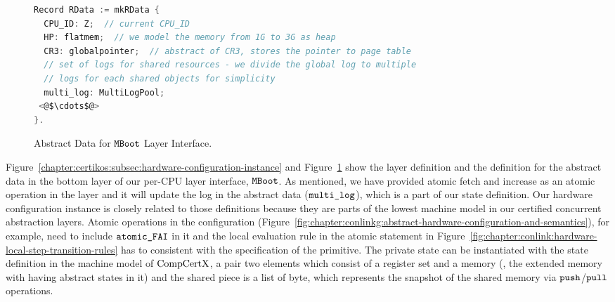 \begin{figure}
\begin{lstlisting}[language=C]
Record RData := mkRData {
  CPU_ID: Z;  // current CPU_ID
  HP: flatmem;  // we model the memory from 1G to 3G as heap            
  CR3: globalpointer;  // abstract of CR3, stores the pointer to page table
  // set of logs for shared resources - we divide the global log to multiple
  // logs for each shared objects for simplicity   
  multi_log: MultiLogPool;     
 <@$\cdots$@>
}.
\end{lstlisting}
\caption{Abstract Data for  ${\mathrm{\texttt{MBoot}}}$ Layer Interface.}
\label{fig:chapter:certikos:abstract-data-for-bottom-layer}
\end{figure}

Figure~\ref{chapter:certikos:subsec:hardware-configuration-instance}
 and 
  Figure~\ref{fig:chapter:certikos:abstract-data-for-bottom-layer}
  show the layer definition 
  and the definition for the abstract data 
  in the bottom layer of our per-CPU layer interface, ${\mathrm{\texttt{MBoot}}}$.
%
As mentioned, 
we have provided atomic fetch and increase as an atomic operation in the layer 
and it will update the log in the abstract data (${\mathrm{\texttt{multi\_log}}}$), which is 
a part of our state definition. 
Our hardware configuration instance is closely related to those definitions
because they are parts of the lowest machine model 
in our certified concurrent abstraction layers.
Atomic operations in the configuration (Figure~\ref{fig:chapter:conlinkg:abstract-hardware-configuration-and-semantics}), for example,
need to include ${\mathrm{\texttt{atomic\_FAI}}}$  
in it and the local evaluation rule in the atomic statement in Figure~\ref{fig:chapter:conlink:hardware-local-step-transition-rules}  has to 
consistent with the specification of the primitive.
The private state can be instantiated with 
the state definition in the machine model of $\mathrm{CompCertX}$, a pair two elements which consist of a register set 
and a memory (\ie, the extended memory with having abstract states in it)
and the shared piece is a list of byte, which represents 
the snapshot of the shared memory via ${\mathrm{\texttt{push}}}$/${\mathrm{\texttt{pull}}}$ operations. 

